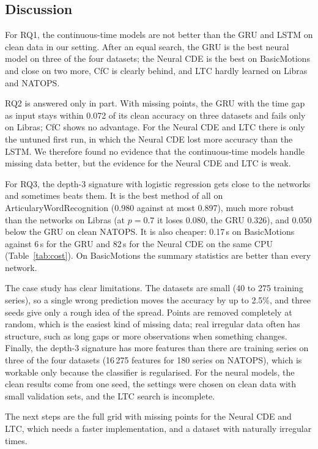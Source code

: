 \subsection{Discussion}

For RQ1, the continuous-time models are not better than the GRU and LSTM
on clean data in our setting. After an equal search, the GRU is the best
neural model on three of the four datasets; the Neural CDE is the best on
BasicMotions and close on two more, CfC is clearly behind, and LTC hardly
learned on Libras and NATOPS.

RQ2 is answered only in part. With missing points, the GRU with the time
gap as input stays within 0.072 of its clean accuracy on three datasets
and fails only on Libras; CfC shows no advantage. For the Neural CDE and
LTC there is only the untuned first run, in which the Neural CDE lost more
accuracy than the LSTM. We therefore found no evidence that the
continuous-time models handle missing data better, but the evidence for
the Neural CDE and LTC is weak.

For RQ3, the depth-3 signature with logistic regression gets close to the
networks and sometimes beats them. It is the best method of all on
ArticularyWordRecognition (0.980 against at most 0.897), much more robust
than the networks on Libras (at $p = 0.7$ it loses 0.080, the GRU 0.326),
and 0.050 below the GRU on clean NATOPS. It is also cheaper: 0.17\,s on
BasicMotions against 6\,s for the GRU and 82\,s for the Neural CDE on the
same CPU (Table~\ref{tab:cost}). On BasicMotions the summary statistics
are better than every network.

The case study has clear limitations. The datasets are small (40 to 275
training series), so a single wrong prediction moves the accuracy by up to
2.5\%, and three seeds give only a rough idea of the spread. Points are
removed completely at random, which is the easiest kind of missing data;
real irregular data often has structure, such as long gaps or more
observations when something changes. Finally, the depth-3 signature has
more features than there are training series on three of the four
datasets (16\,275 features for 180 series on NATOPS), which is workable
only because the classifier is regularised. For the neural models, the
clean results come from one seed, the settings were chosen on clean data
with small validation sets, and the LTC search is incomplete.

The next steps are the full grid with missing points for the Neural CDE
and LTC, which needs a faster implementation, and a dataset with
naturally irregular times.

